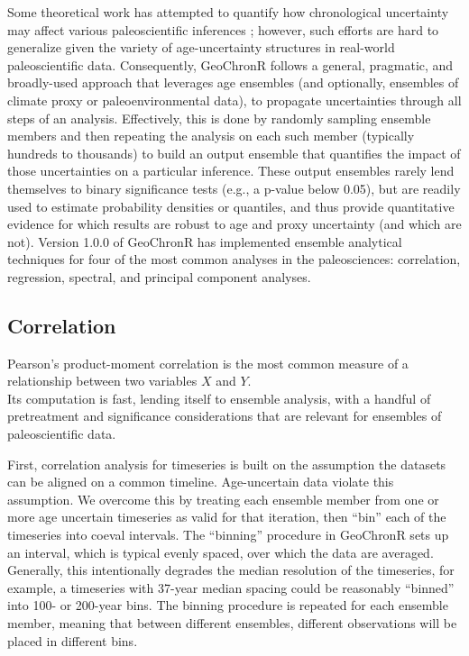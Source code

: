 \documentclass[gchron, manuscript]{copernicus}
\begin{document}
Some theoretical work has attempted to quantify how chronological uncertainty may affect various paleoscientific inferences \citep[e.g.][]{HuybersWunsch2004}; however, such efforts are hard to generalize given the variety of age-uncertainty structures in real-world paleoscientific data.
Consequently, GeoChronR follows a general, pragmatic, and broadly-used approach that leverages age ensembles (and optionally, ensembles of climate proxy or paleoenvironmental data), to propagate uncertainties through all steps of an analysis.
Effectively, this is done by randomly sampling ensemble members and then repeating the analysis on each such member (typically hundreds to thousands) to build an output ensemble that quantifies the impact of those uncertainties on a particular inference.
These output ensembles rarely lend themselves to binary significance tests (e.g., a p-value below 0.05), but are readily used to estimate probability densities or quantiles, and thus provide quantitative evidence for which results are robust to age and proxy uncertainty (and which are not).
Version 1.0.0 of GeoChronR has implemented ensemble analytical techniques for four of the most common analyses in the paleosciences: correlation, regression, spectral, and principal component analyses.

\hypertarget{sec:correlation}{%
\subsection{Correlation}\label{sec:correlation}}

Pearson's product-moment correlation is the most common measure of a relationship between two variables \(X\) and \(Y\).\\
Its computation is fast, lending itself to ensemble analysis, with a handful of pretreatment and significance considerations that are relevant for ensembles of paleoscientific data.

First, correlation analysis for timeseries is built on the assumption the datasets can be aligned on a common timeline.
Age-uncertain data violate this assumption.
We overcome this by treating each ensemble member from one or more age uncertain timeseries as valid for that iteration, then ``bin'' each of the timeseries into coeval intervals.
The ``binning'' procedure in GeoChronR sets up an interval, which is typical evenly spaced, over which the data are averaged. Generally, this intentionally degrades the median resolution of the timeseries, for example, a timeseries with 37-year median spacing could be reasonably ``binned'' into 100- or 200-year bins.
The binning procedure is repeated for each ensemble member, meaning that between different ensembles, different observations will be placed in different bins.
\end{document}

